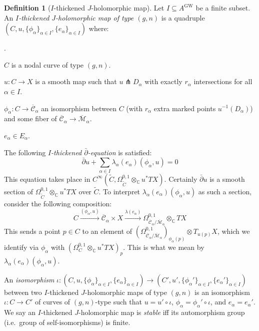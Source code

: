 \documentclass[12pt]{article}
\theoremstyle{definition}
\newtheorem{definition}[theorem]{Definition}
\theoremstyle{remark}
\numberwithin{equation}{subsection}
\newcommand{\CC}{\mathbb C}
\newcommand{\Mbar}{\overline{\mathcal M}}
\newcommand{\Cbar}{\overline{\mathcal C}}
\newcommand{\delbar}{\bar\partial}
\newcommand{\GW}{\mathrm{GW}}
\newcounter{rcounti}
\newenvironment{rlist}{\begin{list}{\roman{rcounti}.}{\usecounter{rcounti}
\setlength\itemsep{0pt}
\setlength\labelsep{4pt}
\setlength\labelwidth{16pt}
\setlength\leftmargin{32pt}
\setlength\listparindent{0pt}
\setlength\parsep{0pt}
\setlength\parskip{0pt}
\setlength\partopsep{0pt}
\setlength\rightmargin{0pt}
\setlength\topsep{0pt}
\setlength\itemindent{0pt}
}}{\end{list}}
\begin{document}
\begin{definition}[$I$-thickened $J$-holomorphic map]\label{thickendefs}
Let $I\subseteq A^\GW$ be a finite subset.  An \emph{$I$-thickened $J$-holomorphic map of type $(g,n)$} is a quadruple $(C,u,\{\phi_\alpha\}_{\alpha\in I},\{e_\alpha\}_{\alpha\in I})$ where:
\begin{rlist}
\item$C$ is a nodal curve of type $(g,n)$.
\item$u:C\to X$ is a smooth map such that $u\pitchfork D_\alpha$ with exactly $r_\alpha$ intersections for all $\alpha\in I$.
\item$\phi_\alpha:C\to\Cbar_\alpha$ an isomorphism between $C$ (with $r_\alpha$ extra marked points $u^{-1}(D_\alpha)$) and some fiber of $\Cbar_\alpha\to\Mbar_\alpha$.
\item$e_\alpha\in E_\alpha$.
\item The following \emph{$I$-thickened $\delbar$-equation} is satisfied:
\begin{equation}\label{complementeddelbar}
\delbar u+\sum_{\alpha\in I}\lambda_\alpha(e_\alpha)(\phi_\alpha,u)=0
\end{equation}
This equation takes place in $C^\infty(\tilde C,\Omega^{0,1}_{\tilde C}\otimes_\CC u^\ast TX)$.  Certainly $\delbar u$ is a smooth section of $\Omega^{0,1}_{\tilde C}\otimes_\CC u^\ast TX$ over $\tilde C$.  To interpret $\lambda_\alpha(e_\alpha)(\phi_\alpha,u)$ as such a section, consider the following composition:
\begin{equation}
C\xrightarrow{(\phi_\alpha,u)}\Cbar_\alpha\times X\xrightarrow{\lambda(e_\alpha)}\Omega^{0,1}_{\Cbar_\alpha/\Mbar_\alpha}\otimes_\CC TX
\end{equation}
This sends a point $p\in C$ to an element of $(\Omega^{0,1}_{\Cbar_\alpha/\Mbar_\alpha})_{\phi_\alpha(p)}\otimes T_{u(p)}X$, which we identify via $\phi_\alpha$ with $(\Omega^{0,1}_C\otimes_\CC u^\ast TX)_p$.  This is what we mean by $\lambda_\alpha(e_\alpha)(\phi_\alpha,u)$.
\end{rlist}
An \emph{isomorphism} $\iota:(C,u,\{\phi_\alpha\}_{\alpha\in I},\{e_\alpha\}_{\alpha\in I})\to(C',u',\{\phi_\alpha'\}_{\alpha\in I},\{e_\alpha'\}_{\alpha\in I})$ between two $I$-thickened $J$-holomorphic maps of type $(g,n)$ is an isomorphism $\iota:C\to C'$ of curves of $(g,n)$-type such that $u=u'\circ\iota$, $\phi_\alpha=\phi_\alpha'\circ\iota$, and $e_\alpha=e_\alpha'$.  We say an $I$-thickened $J$-holomorphic map is \emph{stable} iff its automorphism group (i.e.\ group of self-isomorphisms) is finite.
\end{definition}
\end{document}
